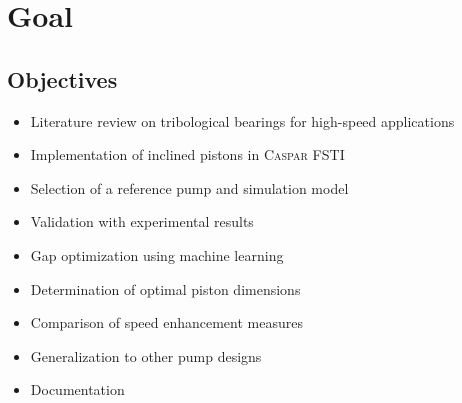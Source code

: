 {\chapter{Goal}}
\label{sec:Goal}

\section{Objectives}
\begin{itemize}
    \item Literature review on tribological bearings for high-speed applications
    \item Implementation of inclined pistons in \textsc{Caspar FSTI}
    \item Selection of a reference pump and simulation model
    \item Validation with experimental results
    \item Gap optimization using machine learning
    \item Determination of optimal piston dimensions
    \item Comparison of speed enhancement measures
    \item Generalization to other pump designs
    \item Documentation
\end{itemize}
